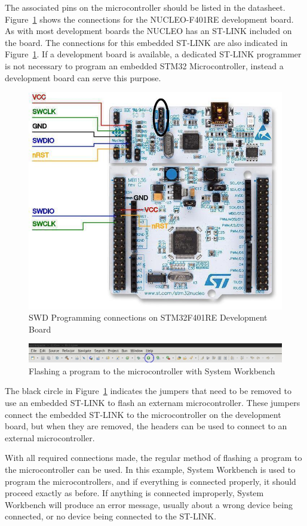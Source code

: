 \documentclass{article}
\begin{document}
  The associated pins on the microcontroller should be listed in the datasheet.
  Figure~\ref{fig:nucleo_swd_connections} shows the connections for the
  NUCLEO-F401RE development board. As with most development boards the NUCLEO
  has an ST-LINK included on the board. The connections for this embedded
  ST-LINK are also indicated in Figure~\ref{fig:nucleo_swd_connections}. If a
  development board is available, a dedicated ST-LINK programmer is not
  necessary to program an embedded STM32 Microcontroller, instead a development
  board can serve this purpose.

  \begin{figure}[ht]
    \centering
    \includegraphics[width=.65\textwidth]{images/programming/stm32_nucleo_f401re_connections.jpg}
    \caption{SWD Programming connections on STM32F401RE Development Board}
    \label{fig:nucleo_swd_connections}
  \end{figure}

  \begin{figure}[ht]
    \includegraphics[width=\textwidth]{images/programming/syswb_flash.jpg}
    \caption{Flashing a program to the microcontroller with System Workbench}
  \end{figure}

  The black circle in Figure~\ref{fig:nucleo_swd_connections} indicates the
  jumpers that need to be removed to use an embedded ST-LINK to flash an
  externam microcontroller. These jumpers connect the embedded ST-LINK to the
  microcontroller on the development board, but when they are removed, the
  headers can be used to connect to an external microcontroller.

  With all required connections made, the regular method of flashing a program
  to the microcontroller can be used. In this example, System Workbench is used
  to program the microcontrollers, and if everything is connected properly, it
  should proceed exactly as before. If anything is connected improperly, System
  Workbench will produce an error message, usually about a wrong device being
  connected, or no device being connected to the ST-LINK.
\end{document}
